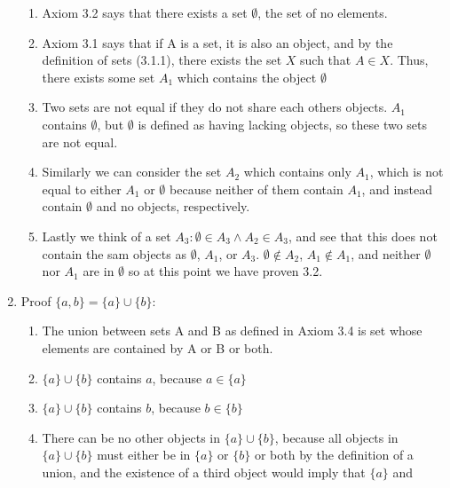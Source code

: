 \documentclass{article}
\begin{document}
\begin{enumerate}
            \begin{enumerate}
                \item Axiom 3.2 says that there exists a set $\emptyset$, the set of no elements.
                \item Axiom 3.1 says that if A is a set, it is also an object,
                    and by the definition of sets (3.1.1), there exists the set $X$
                    such that $A \in X$. Thus, there exists some set $A_1$ which contains the object $\emptyset$
                \item Two sets are not equal if they do not share each others
                    objects. $A_1$ contains $\emptyset$, but $\emptyset$ is
                    defined as having lacking objects, so these two sets are
                    not equal.
                \item Similarly we can consider the set $A_2$ which contains only $A_1$, which is not equal to
                    either $A_1$ or $\emptyset$ because neither of them contain $A_1$, and instead contain
                    $\emptyset$ and no objects, respectively.
                \item Lastly we think of a set $A_3 : \emptyset \in A_3 \land
                    A_2 \in A_3$, and see that this does not contain the sam
                    objects as $\emptyset$, $A_1$, or $A_3$. $\emptyset \notin
                    A_2$, $A_1 \notin A_1$, and neither $\emptyset$ nor $A_1$
                    are in $\emptyset$ so at this point we have proven 3.2.
            \end{enumerate}
        \item Proof $\{a,b\} = \{a\} \cup \{b\}$:
            \begin{enumerate}
                \item The union between sets A and B as defined in
                    Axiom 3.4 is set whose elements are contained by A
                    or B or both.
                \item $\{a\} \cup \{b\}$ contains $a$, because $a \in \{a\}$
                \item $\{a\} \cup \{b\}$ contains $b$, because $b \in \{b\}$
                \item There can be no other objects in  $\{a\} \cup \{b\}$, because 
                    all objects in $\{a\} \cup \{b\}$ must either be in $\{a\}$
                    or $\{b\}$ or both by the definition of a union, and the
                    existence of a third object would imply that $\{a\}$ and

\end{enumerate}
\end{enumerate}
\end{document}
